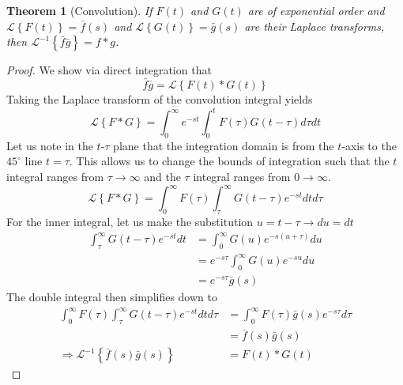 \documentclass{report}
\newtheorem{theorem}{Theorem}[chapter]
\theoremstyle{definition}
\theoremstyle{remark}
\newcommand{\lapt}[1]{\mathscr{L}\left\{ #1\right\}}
\newcommand{\inlt}[1]{\mathscr{L}^{-1} \left\{ #1 \right\}}
\begin{document}
\begin{theorem}[Convolution]
    If $F(t)$ and $G(t)$ are of exponential order and $\lapt{F(t)} = \bar{f}(s)$ and $\lapt{G(t)} = \bar{g}(s)$ are their Laplace transforms, then $\inlt{\bar{f}\bar{g}}=f*g$. \label{theo:convolution}
\end{theorem}
\begin{proof}
    We show via direct integration that 
    \begin{equation*}
        \bar{f}\bar{g}=\lapt{F(t)*G(t)}
    \end{equation*}
    Taking the Laplace transform of the convolution integral yields 
    \begin{equation*}
        \lapt{F*G} = \int^\infty_0e^{-st}\int^t_0F(\tau)G(t-\tau)d\tau dt
    \end{equation*}
    Let us note in the $t$-$\tau$ plane that the integration domain is from the $t$-axis to the $45^\circ$ line $t=\tau$. This allows us to change the bounds of integration such that the $t$ integral ranges from $\tau \rightarrow \infty$ and the $\tau$ integral ranges from $0\rightarrow \infty$. 
    \begin{equation*}
            \lapt{F*G} = \int^\infty_0F(\tau)\int^\infty_\tau G(t-\tau)e^{-st}dtd\tau
    \end{equation*}
    For the inner integral, let us make the substitution $u=t-\tau\rightarrow du=dt$
    \begin{equation*}
        \begin{split}
            \int^\infty_\tau G(t-\tau)e^{-st}dt &= \int^\infty_0G(u)e^{-s(u+\tau)}du \\
            &=e^{-s\tau}\int^\infty_0 G(u)e^{-su}du \\
            &=e^{-s\tau}\bar{g}(s)
        \end{split}
    \end{equation*}
    The double integral then simplifies down to 
    \begin{equation*}
        \begin{split}
            \int^\infty_0F(\tau)\int^\infty_\tau G(t-\tau)e^{-st}dtd\tau &=\int^\infty_0F(\tau)\bar{g}(s)e^{-s\tau}d\tau \\
            &=\bar{f}(s)\bar{g}(s)\\
            \Rightarrow\inlt{\bar{f}(s)\bar{g}(s)} &=F(t)*G(t)
        \end{split}
    \end{equation*}
\end{proof}
\end{document}
